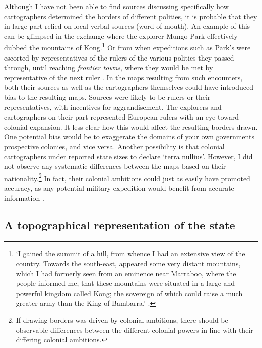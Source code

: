 \documentclass[12pt]{article}
\begin{document}
Although I have not been able to find sources discussing specifically how
cartographers determined the borders of different polities, it is probable that
they in large part relied on local verbal sources (word of mouth). An example of
this can be glimpsed in the exchange where the explorer Mungo Park effectively
dubbed the mountains of Kong.\footnote{`I gained the summit of a hill, from
	whence I had an extensive view of the country. Towards the south-east,
	appeared some very distant mountains, which I had formerly seen from an
	eminence near Marraboo, where the people informed me, that these
	mountains were situated in a large and powerful kingdom called Kong; the
sovereign of which could raise a much greater army than the King of Bambarra.'
\citep[CHAPTER XVIII]{ParkMungo2015Titi}.} Or from when expeditions such as
Park's were escorted by representatives of the rulers of the various polities
they passed through, until reaching \textit{frontier towns}, where they would be
met by representative of the next ruler \citep{ParkMungo2015Titi}. In the maps
resulting from such encounters, both their sources as well as the cartographers
themselves could have introduced bias to the resulting maps. Sources were likely
to be rulers or their representatives, with incentives for aggrandisement. The
explorers and cartographers on their part represented European rulers with an
eye toward colonial expansion. It less clear how this would affect the resulting
borders drawn. One potential bias would be to exaggerate the domains of your own
governments prospective colonies, and vice versa. Another possibility is that
colonial cartographers under reported state sizes to declare `terra nullius'.
However, I did not observe any systematic differences between the maps based on
their nationality.\footnote{If drawing borders was driven by colonial ambitions,
there should be observable differences between the different colonial powers in
line with their differing colonial ambitions.} In fact, their colonial ambitions
could just as easily have promoted accuracy, as any potential military
expedition would benefit from accurate information \citep{Bassett_1994}.

\subsection{A topographical representation of the state} 
\label{A topographical representation of the state}
\end{document}

